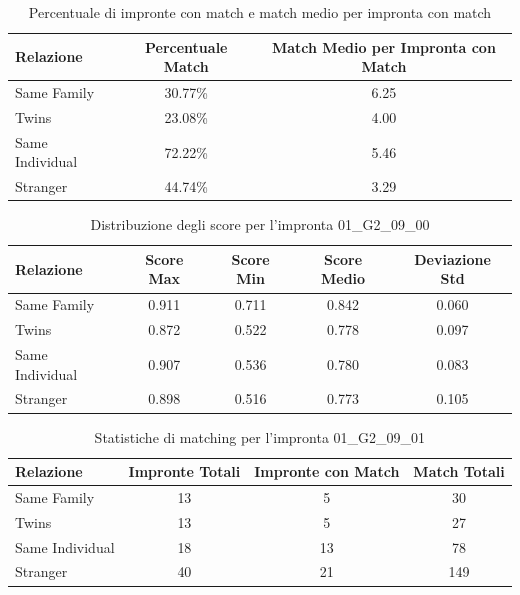 \begin{table}[htbp]
\centering
\caption{Percentuale di impronte con match e match medio per impronta con match}
\label{tab:match_percentage_01_G2_09_00}
\begin{tabular}{|l|c|c|}
\hline
\textbf{Relazione} & \textbf{Percentuale Match} & \textbf{Match Medio per Impronta con Match} \\
\hline
Same Family & 30.77\% & 6.25 \\
\hline
Twins & 23.08\% & 4.00 \\
\hline
Same Individual & 72.22\% & 5.46 \\
\hline
Stranger & 44.74\% & 3.29 \\
\hline
\end{tabular}
\end{table}


\begin{table}[htbp]
\centering
\caption{Distribuzione degli score per l'impronta 01\_G2\_09\_00}
\label{tab:scores_01_G2_09_00}
\begin{tabular}{|l|c|c|c|c|}
\hline
\textbf{Relazione} & \textbf{Score Max} & \textbf{Score Min} & \textbf{Score Medio} & \textbf{Deviazione Std} \\
\hline
Same Family & 0.911 & 0.711 & 0.842 & 0.060 \\
\hline
Twins & 0.872 & 0.522 & 0.778 & 0.097 \\
\hline
Same Individual & 0.907 & 0.536 & 0.780 & 0.083 \\
\hline
Stranger & 0.898 & 0.516 & 0.773 & 0.105 \\
\hline
\end{tabular}
\end{table}


\begin{table}[htbp]
\centering
\caption{Statistiche di matching per l'impronta 01\_G2\_09\_01}
\label{tab:results_01_G2_09_01}
\begin{tabular}{|l|c|c|c|}
\hline
\textbf{Relazione} & \textbf{Impronte Totali} & \textbf{Impronte con Match} & \textbf{Match Totali} \\
\hline
Same Family & 13 & 5 & 30 \\
\hline
Twins & 13 & 5 & 27 \\
\hline
Same Individual & 18 & 13 & 78 \\
\hline
Stranger & 40 & 21 & 149 \\
\hline
\end{tabular}
\end{table}


